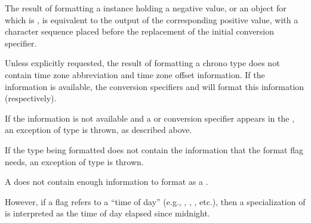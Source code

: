 \pnum
The result of formatting
a  instance holding a negative value, or
an  object  for which  is ,
is equivalent to the output of the corresponding positive value,
with a  character sequence
placed before the replacement of the initial conversion specifier.
\begin{example}
\end{example}

\pnum
Unless explicitly requested,
the result of formatting a chrono type
does not contain time zone abbreviation
and time zone offset information.
If the information is available,
the conversion specifiers  and 
will format this information (respectively).
\begin{note}
If the information is not available and
a  or 
conversion specifier appears in
the ,
an exception of type  is thrown,
as described above.
\end{note}

\pnum
If the type being formatted does not contain
the information that the format flag needs,
an exception of type  is thrown.
\begin{example}
A  does not contain enough information
to format as a .
\end{example}
However, if a flag refers to a ``time of day''
(e.g., , , , etc.),
then a specialization of  is interpreted as
the time of day elapsed since midnight.

